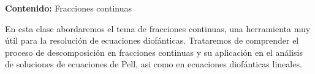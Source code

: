 {\Large\textbf{Contenido:} Fracciones continuas}

En esta clase abordaremos el tema de fracciones continuas, una herramienta muy útil para la resolución de ecuaciones diofánticas.
Trataremos de comprender el proceso de descomposición en fracciones continuas y su aplicación en el análisis de soluciones de ecuaciones de Pell, asi como en ecuaciones diofánticas lineales.